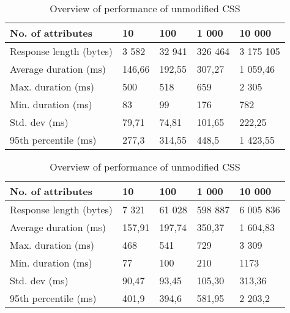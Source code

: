 \begin{table}[H]
\begin{subtable}{1.0\textwidth}
\centering
\begin{tabular}{lllll}
\textbf{No. of attributes} & \textbf{10} & \textbf{100} & \textbf{1 000} & \textbf{10 000} \\ \hline
Response length (bytes)    & 3 582        & 32 941        & 326 464        & 3 175 105        \\
Average duration (ms)      & 146,66      & 192,55       & 307,27        & 1 059,46        \\
Max. duration (ms)         & 500         & 518          & 659           & 2 305           \\
Min. duration (ms)         & 83          & 99           & 176           & 782            \\
Std. dev (ms)              & 79,71       & 74,81        & 101,65        & 222,25         \\
95th percentile (ms)       & 277,3       & 314,55       & 448,5         & 1 423,55       
\end{tabular}
\caption{Performance overview of unmodified \acrshort{CSS} when requesting transaction data}
\label{table:results-vanilla-json}
\end{subtable}

\vspace*{0.5 cm}

\begin{subtable}{1.0\textwidth}
\centering
\begin{tabular}{lllll}
\textbf{No. of attributes} & \textbf{10} & \textbf{100} & \textbf{1 000} & \textbf{10 000} \\ \hline
Response length (bytes)    & 7 321       & 61 028       & 598 887        & 6 005 836       \\
Average duration (ms)      & 157,91      & 197,74       & 350,37         & 1 604,83         \\
Max. duration (ms)         & 468         & 541          & 729            & 3 309           \\
Min. duration (ms)         & 77          & 100          & 210            & 1173            \\
Std. dev (ms)              & 90,47       & 93,45        & 105,30         & 313,36          \\
95th percentile (ms)       & 401,9       & 394,6        & 581,95         & 2 203,2        
\end{tabular}
\caption{Performance overview of unmodified \acrshort{CSS} when requesting exercise data}
\label{table:results-vanilla-xml}
\end{subtable}

\caption{Overview of performance of unmodified \acrshort{CSS}}
\label{table:results-exp1-unmodified}

\end{table}